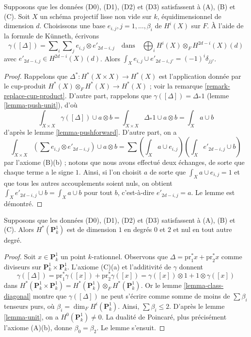 \begin{lemma}
\label{lemma-class-diagonal}
Supposons que les données (D0), (D1), (D2) et (D3) satisfassent à (A), (B) et (C).
Soit $X$ un schéma projectif lisse non vide sur $k$, équidimensionnel
de dimension $d$. Choisissons une base $e_{i, j}, j = 1, \ldots, \beta_i$ de
$H^i(X)$ sur $F$. À l'aide de la formule de K\"unneth, écrivons
$$
\gamma([\Delta]) =
\sum\nolimits_i
\sum\nolimits_j e_{i, j} \otimes e'_{2d - i , j}
\quad\text{dans}\quad
\bigoplus\nolimits_i H^i(X) \otimes_F H^{2d - i}(X)(d)
$$
avec $e'_{2d - i, j} \in H^{2d - i}(X)(d)$.
Alors $\int_X e_{i, j} \cup e'_{2d - i, j'} = (-1)^i\delta_{jj'}$.
\end{lemma}

\begin{proof}
Rappelons que $\Delta^* : H^*(X \times X) \to H^*(X)$ est l'application
donnée par le cup-produit $H^*(X) \otimes_F H^*(X) \to H^*(X)$ ; voir
la remarque \ref{remark-replace-cup-product}. D'autre part,
rappelons que $\gamma([\Delta]) = \Delta_*1$ (lemme \ref{lemma-push-unit}),
d'où
$$
\int_{X \times X} \gamma([\Delta]) \cup a \otimes b =
\int_{X \times X} \Delta_*1 \cup a \otimes b =
\int_X a \cup b
$$
d'après le lemme \ref{lemma-pushforward}.
D'autre part, on a
$$
\int_{X \times X} (\sum e_{i, j} \otimes e'_{2d -i , j}) \cup a \otimes b =
\sum (\int_X a \cup e_{i, j})(\int_X e'_{2d - i, j} \cup b)
$$
par l'axiome (B)(b) ; notons que nous avons effectué deux échanges, de sorte que
chaque terme a le signe $1$. Ainsi, si l'on choisit $a$ de sorte que
$\int_X a \cup e_{i, j} = 1$ et que tous les autres accouplements soient nuls,
on obtient $\int_X e'_{2d - i, j} \cup b = \int_X a \cup b$
pour tout $b$, c'est-à-dire $e'_{2d - i, j} = a$. Le lemme est démontré.
\end{proof}

\begin{lemma}
\label{lemma-cohomology-P1}
Supposons que les données (D0), (D1), (D2) et (D3) satisfassent à (A), (B) et (C).
Alors $H^*(\mathbf{P}^1_k)$ est de dimension $1$ en degrés $0$ et $2$
et nul en tout autre degré.
\end{lemma}

\begin{proof}
Soit $x \in \mathbf{P}^1_k$ un point $k$-rationnel. Observons que
$\Delta = \text{pr}_1^*x + \text{pr}_2^*x$ comme diviseurs sur
$\mathbf{P}^1_k \times \mathbf{P}^1_k$. L'axiome (C)(a)
et l'additivité de $\gamma$ donnent
$$
\gamma([\Delta]) =
\text{pr}_1^*\gamma([x]) +
\text{pr}_2^*\gamma([x]) =
\gamma([x]) \otimes 1 + 1 \otimes \gamma([x])
$$
dans $H^*(\mathbf{P}^1_k \times \mathbf{P}^1_k) =
H^*(\mathbf{P}^1_k) \otimes_F H^*(\mathbf{P}^1_k)$.
Or le lemme \ref{lemma-class-diagonal}
montre que $\gamma([\Delta])$ ne peut s'écrire
comme somme de moins de $\sum \beta_i$ tenseurs purs,
où $\beta_i = \dim_F H^i(\mathbf{P}^1_k)$.
Ainsi, $\sum \beta_i \leq 2$.
D'après le lemme \ref{lemma-unit}, on a $H^0(\mathbf{P}^1_k) \not = 0$.
La dualité de Poincar\'e, plus précisément l'axiome (A)(b),
donne $\beta_0 = \beta_2$. Le lemme s'ensuit.
\end{proof}

